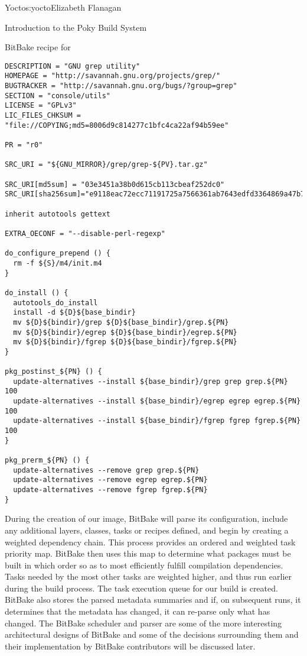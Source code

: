 \begin{aosachapter}{Yocto}{s:yocto}{Elizabeth Flanagan}
\begin{aosasect1}{Introduction to the Poky Build System}

\begin{aosabox}{BitBake recipe for }
\begin{verbatim}
DESCRIPTION = "GNU grep utility"
HOMEPAGE = "http://savannah.gnu.org/projects/grep/"
BUGTRACKER = "http://savannah.gnu.org/bugs/?group=grep"
SECTION = "console/utils"
LICENSE = "GPLv3"
LIC_FILES_CHKSUM = "file://COPYING;md5=8006d9c814277c1bfc4ca22af94b59ee"

PR = "r0"

SRC_URI = "${GNU_MIRROR}/grep/grep-${PV}.tar.gz"

SRC_URI[md5sum] = "03e3451a38b0d615cb113cbeaf252dc0"
SRC_URI[sha256sum]="e9118eac72ecc71191725a7566361ab7643edfd3364869a47b78dc934a357970"

inherit autotools gettext

EXTRA_OECONF = "--disable-perl-regexp"

do_configure_prepend () {
  rm -f ${S}/m4/init.m4
}

do_install () {
  autotools_do_install
  install -d ${D}${base_bindir}
  mv ${D}${bindir}/grep ${D}${base_bindir}/grep.${PN}
  mv ${D}${bindir}/egrep ${D}${base_bindir}/egrep.${PN}
  mv ${D}${bindir}/fgrep ${D}${base_bindir}/fgrep.${PN}
}

pkg_postinst_${PN} () {
  update-alternatives --install ${base_bindir}/grep grep grep.${PN} 100
  update-alternatives --install ${base_bindir}/egrep egrep egrep.${PN} 100
  update-alternatives --install ${base_bindir}/fgrep fgrep fgrep.${PN} 100
}

pkg_prerm_${PN} () {
  update-alternatives --remove grep grep.${PN}
  update-alternatives --remove egrep egrep.${PN}
  update-alternatives --remove fgrep fgrep.${PN}
}
\end{verbatim}
\end{aosabox}

During the creation of our image, BitBake will parse its
configuration, include any additional layers, classes, tasks or
recipes defined, and begin by creating a weighted dependency
chain. This process provides an ordered and weighted task priority
map. BitBake then uses this map to determine what packages must be
built in which order so as to most efficiently fulfill compilation
dependencies. Tasks needed by the most other tasks are weighted higher,
and thus run earlier during the build process. The task execution
queue for our build is created. BitBake also stores the parsed
metadata summaries and if, on subsequent runs, it determines that the
metadata has changed, it can re-parse only what has changed. The
BitBake scheduler and parser are some of the more interesting
architectural designs of BitBake and some of the decisions surrounding
them and their implementation by BitBake contributors will
be discussed later.


\end{aosasect1}
\end{aosachapter}
